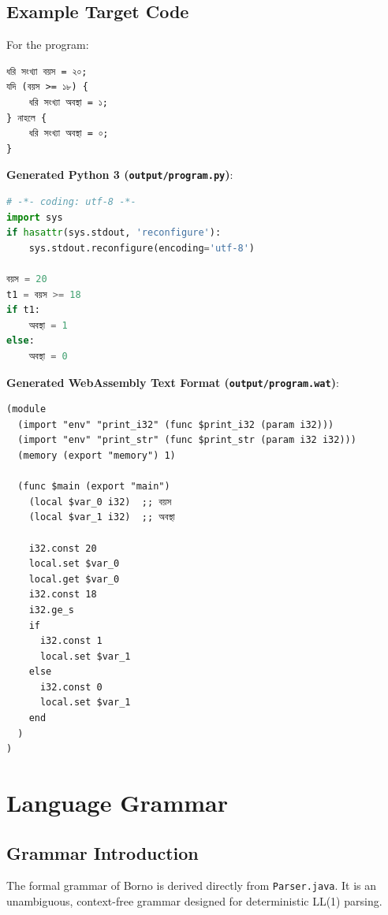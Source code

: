 \documentclass[12pt, a4paper]{report}
\begin{document}
\section{Example Target Code}
For the program:
\begin{lstlisting}
ধরি সংখ্যা বয়স = ২০;
যদি (বয়স >= ১৮) {
    ধরি সংখ্যা অবস্থা = ১;
} নাহলে {
    ধরি সংখ্যা অবস্থা = ০;
}
\end{lstlisting}

\noindent\textbf{Generated Python 3 (\texttt{output/program.py})}:
\begin{lstlisting}[language=Python]
# -*- coding: utf-8 -*-
import sys
if hasattr(sys.stdout, 'reconfigure'):
    sys.stdout.reconfigure(encoding='utf-8')

বয়স = 20
t1 = বয়স >= 18
if t1:
    অবস্থা = 1
else:
    অবস্থা = 0
\end{lstlisting}

\noindent\textbf{Generated WebAssembly Text Format (\texttt{output/program.wat})}:
\begin{lstlisting}
(module
  (import "env" "print_i32" (func $print_i32 (param i32)))
  (import "env" "print_str" (func $print_str (param i32 i32)))
  (memory (export "memory") 1)

  (func $main (export "main")
    (local $var_0 i32)  ;; বয়স
    (local $var_1 i32)  ;; অবস্থা

    i32.const 20
    local.set $var_0
    local.get $var_0
    i32.const 18
    i32.ge_s
    if
      i32.const 1
      local.set $var_1
    else
      i32.const 0
      local.set $var_1
    end
  )
)
\end{lstlisting}

\chapter{Language Grammar}

\section{Grammar Introduction}
The formal grammar of Borno is derived directly from \texttt{Parser.java}. It is an unambiguous, context-free grammar designed for deterministic LL(1) parsing.
\end{document}
